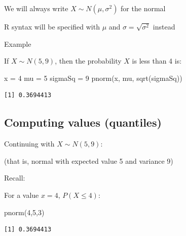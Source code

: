 \documentclass[
  letterpaper,
  DIV=11,
  numbers=noendperiod]{scrartcl}
\newenvironment{Shaded}{\begin{snugshade}}{\end{snugshade}}
\newcommand{\DecValTok}[1]{\textcolor[rgb]{0.68,0.00,0.00}{#1}}
\newcommand{\FunctionTok}[1]{\textcolor[rgb]{0.28,0.35,0.67}{#1}}
\newcommand{\NormalTok}[1]{\textcolor[rgb]{0.00,0.23,0.31}{#1}}
\newcommand{\OtherTok}[1]{\textcolor[rgb]{0.00,0.23,0.31}{#1}}
\begin{document}
We will always write \(X\sim N(\mu,\sigma^2)\) for the normal

R syntax will be specified with \(\mu\) and \(\sigma = \sqrt{\sigma^2}\)
instead

{Example}

If \(X \sim N(5,9)\), then the probability \(X\) is less than 4 is:

\begin{Shaded}
\begin{Highlighting}[numbers=left,,]
\NormalTok{x       }\OtherTok{=} \DecValTok{4}
\NormalTok{mu      }\OtherTok{=} \DecValTok{5}
\NormalTok{sigmaSq }\OtherTok{=} \DecValTok{9}
\FunctionTok{pnorm}\NormalTok{(x, mu, }\FunctionTok{sqrt}\NormalTok{(sigmaSq))}
\end{Highlighting}
\end{Shaded}

\begin{verbatim}
[1] 0.3694413
\end{verbatim}

\subsection{Computing values
(quantiles)}\label{computing-values-quantiles}

Continuing with \(X \sim N(5,9)\):

{(that is, normal with expected value 5 and variance 9)}

{Recall:}

For a value \(x = 4\), \(P(X \leq 4)\):

\begin{Shaded}
\begin{Highlighting}[]
\FunctionTok{pnorm}\NormalTok{(}\DecValTok{4}\NormalTok{,}\DecValTok{5}\NormalTok{,}\DecValTok{3}\NormalTok{)}
\end{Highlighting}
\end{Shaded}

\begin{verbatim}
[1] 0.3694413
\end{verbatim}
\end{document}

